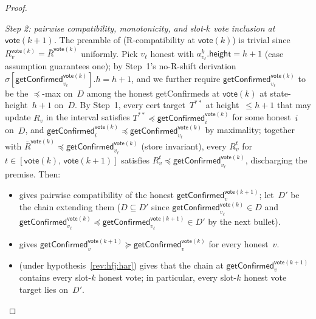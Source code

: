 \documentclass{article}
\newcommand{\height}{\mathsf{height}}
\newcommand{\vote}{\mathsf{vote}}
\newcommand{\comm}[1]{\bar{#1}}
\newcommand{\getConfirmed}{\textsf{getConfirmed}\xspace}
\theoremstyle{plain}
\theoremstyle{definition}
\theoremstyle{remark}
\begin{document}
\begin{proof}
\begin{description}
\emph{Step 2: pairwise compatibility, monotonicity, and slot-$k$ vote inclusion at $\vote(k+1)$.}
The preamble of  (R-compatibility at $\vote(k)$) is trivial since $R_v^{\vote(k)} = \comm{R}^{\vote(k)}$ uniformly. Pick $v_\ell$ honest with $a^k_{v_\ell}.\height = h+1$ (case assumption guarantees one); by Step~1's no-R-shift derivation $\sigma[\getConfirmed_{v_\ell}^{\vote(k)}].h = h+1$, and we further require $\getConfirmed_{v_\ell}^{\vote(k)}$ to be the $\preceq$-max on~$D$ among the honest \getConfirmed{}s at $\vote(k)$ at state-height~$h+1$ on~$D$. By Step~1, every cert target~$T^{**}$ at height~$\leq h+1$ that may update $R_v$ in the interval satisfies $T^{**} \preceq \getConfirmed_i^{\vote(k)}$ for some honest~$i$ on~$D$, and $\getConfirmed_i^{\vote(k)} \preceq \getConfirmed_{v_\ell}^{\vote(k)}$ by maximality; together with $\comm{R}^{\vote(k)} \preceq \getConfirmed_{v_\ell}^{\vote(k)}$ (store invariant), every $R_v^t$ for $t \in [\vote(k),\, \vote(k+1)]$ satisfies $R_v^t \preceq \getConfirmed_{v_\ell}^{\vote(k)}$, discharging the premise. Then:
\begin{itemize}
  \item {} gives pairwise compatibility of the honest $\getConfirmed_v^{\vote(k+1)}$; let~$D'$ be the chain extending them ($D \subseteq D'$ since $\getConfirmed_{v_\ell}^{\vote(k)} \in D$ and $\getConfirmed_{v_\ell}^{\vote(k)} \preceq \getConfirmed_{v_\ell}^{\vote(k+1)} \in D'$ by the next bullet).
  \item {} gives $\getConfirmed_v^{\vote(k+1)} \succeq \getConfirmed_v^{\vote(k)}$ for every honest~$v$.
  \item {} (under hypothesis~\ref{rev:hfj:har}) gives that the chain at $\getConfirmed_v^{\vote(k+1)}$ contains every slot-$k$ honest vote; in particular, every slot-$k$ honest vote target lies on~$D'$.
\end{itemize}


\end{description}
\end{proof}
\end{document}
